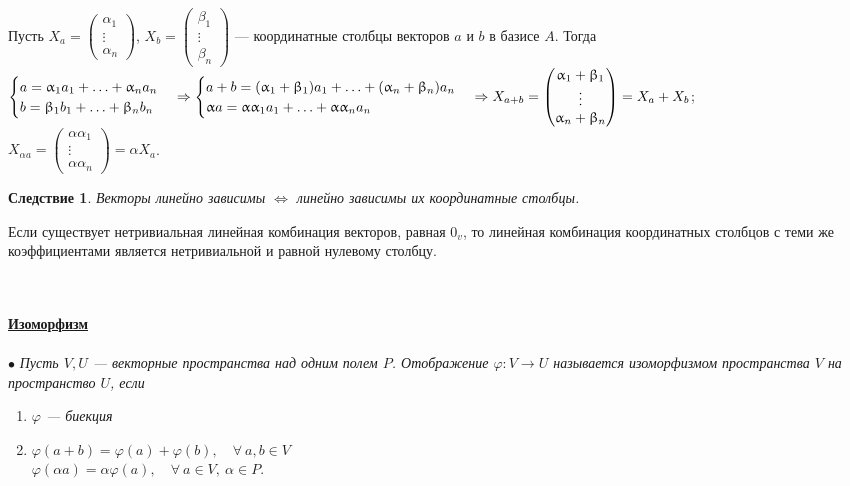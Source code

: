 \begin{Proof}
	Пусть $X_a=\begin{pmatrix} \alpha_1 \\ \vdots \\ \alpha_n \end{pmatrix}$, $X_b=\begin{pmatrix} \beta_1 \\ \vdots \\ \beta_n \end{pmatrix}$ --- координатные столбцы векторов $a$ и $b$ в базисе $A$. Тогда $\begin{cases} a = \alpha_1a_1 + \ldots + \alpha_n{a_n} \\ b = \beta_1b_1 + \ldots + \beta_n{b_n} \end{cases} \Rightarrow \begin{cases} a + b = (\alpha_1+\beta_1)a_1 + \ldots + (\alpha_n+\beta_n){a_n} \\ \alpha a = \alpha \alpha_1 a_1 + \ldots + \alpha \alpha_n a_n \end{cases} \Rightarrow\\ X_{a+b} = \begin{pmatrix} \alpha_1+\beta_1 \\ \vdots \\ \alpha_n+\beta_n \end{pmatrix} = X_a + X_b$;\\ $X_{\alpha a} = \begin{pmatrix} \alpha \alpha_1 \\ \vdots \\ \alpha \alpha_n \end{pmatrix} = \alpha X_a$.
\end{Proof} 
\newtheorem*{cor4_1}{Следствие}\begin{cor4_1} Векторы линейно зависимы $\Longleftrightarrow$ линейно зависимы их координатные столбцы.
\end{cor4_1} \begin{Proof}
	Если существует нетривиальная линейная комбинация векторов, равная $0_v$, то линейная комбинация координатных столбцов с теми же коэффициентами является нетривиальной и равной нулевому столбцу.
\end{Proof}\\\\
\underline{\textbf{Изоморфизм}}\\\\
$\bullet$ \textit{Пусть $V, U$ --- векторные пространства над одним полем $P$. Отображение
	$\varphi: V \rightarrow U$ называется изоморфизмом пространства $V$ на пространство $U$, если}\begin{enumerate}
	\item \textit{$\varphi$ --- биекция}
	\item $\varphi(a+b) = \varphi(a) + \varphi(b),\quad \forall\ a,b \in V$\\
	$\varphi(\alpha a) = \alpha \varphi(a),\quad\forall\ a\in V,\ \alpha \in P$.
\end{enumerate}

